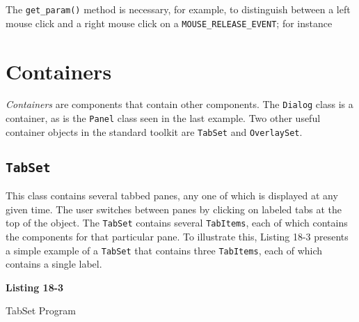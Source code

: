 The \texttt{get\_param()} method is necessary, for example, to
distinguish between a left mouse click and a right mouse click on a
\texttt{MOUSE\_RELEASE\_EVENT}; for instance 


\section{Containers}

\textit{Containers} are components that contain other components.
The \texttt{Dialog} class is a container, as is
the \texttt{Panel} class seen in the last example.
Two other useful container objects in the standard toolkit are \texttt{TabSet}
and \texttt{OverlaySet}.

\subsection*{\texttt{TabSet}}

This class contains several tabbed panes, any one of which
is displayed at any given time. The user switches between panes by clicking on
labeled tabs at the top of the object. The \texttt{TabSet} contains several
\texttt{TabItems}, each of which contains the components for that particular
pane. To illustrate this, Listing 18-3 presents a simple example of a
\texttt{TabSet} that contains three \texttt{TabItems}, each of which contains a
single label.

\bigskip

{\sffamily\bfseries
Listing 18-3

TabSet Program}

